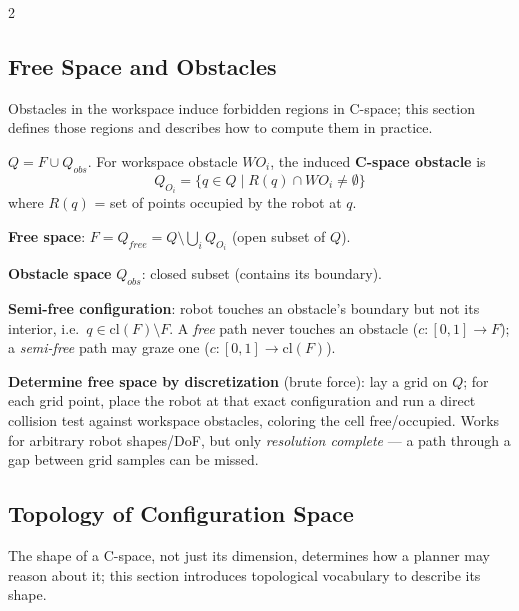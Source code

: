 \documentclass[10pt,a4paper]{article}
\newcommand{\keyterm}[1]{\textbf{#1}}
\begin{document}
\begin{multicols}{2}
\subsection{Free Space and Obstacles}

Obstacles in the workspace induce forbidden regions in C-space; this section defines those regions and describes how to compute them in practice.

$Q=F\cup Q_{obs}$. For workspace obstacle $WO_i$, the induced \keyterm{C-space obstacle} is
\[
Q_{O_i}=\{q\in Q \mid R(q)\cap WO_i\neq\emptyset\}
\]
where $R(q)$ = set of points occupied by the robot at $q$.

\keyterm{Free space}: $F=Q_{free}=Q\setminus\bigcup_i Q_{O_i}$ (open subset of $Q$).

\keyterm{Obstacle space} $Q_{obs}$: closed subset (contains its boundary).

\keyterm{Semi-free configuration}: robot touches an obstacle's boundary but not its interior, i.e.\ $q\in \mathrm{cl}(F)\setminus F$. A \emph{free} path never touches an obstacle ($c:[0,1]\to F$); a \emph{semi-free} path may graze one ($c:[0,1]\to \mathrm{cl}(F)$).
\\
\begin{notebox}
\keyterm{Determine free space by discretization} (brute force): lay a grid on $Q$; for each grid point, place the robot at that exact configuration and run a direct collision test against workspace obstacles, coloring the cell free/occupied. Works for arbitrary robot shapes/DoF, but only \emph{resolution complete} --- a path through a gap between grid samples can be missed.
\end{notebox}

\subsection{Topology of Configuration Space}

The shape of a C-space, not just its dimension, determines how a planner may reason about it; this section introduces topological vocabulary to describe its shape.


\end{multicols}
\end{document}
